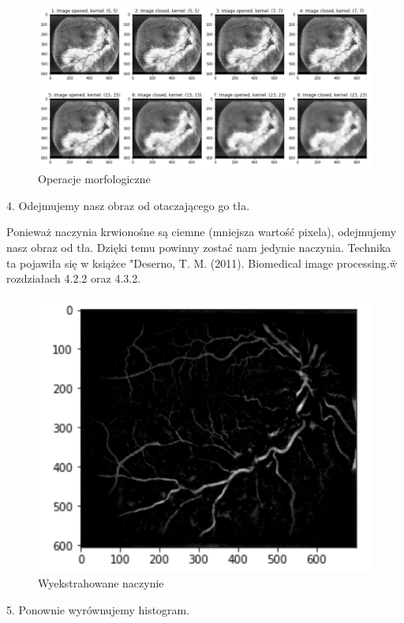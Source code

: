 \documentclass[11pt]{article}
\begin{document}
\begin{figure}[h]
    \centering
	\includegraphics[scale=0.3]{res/img_pro_3.png}
	\caption{Operacje morfologiczne}
	\label{fig:demo}
\end{figure}
\newpage

4. Odejmujemy nasz obraz od otaczającego go tła.

Ponieważ naczynia krwionośne są ciemne (mniejsza wartość pixela), odejmujemy nasz obraz od tła. Dzięki temu powinny zostać nam jedynie naczynia. Technika ta pojawiła się w książce "Deserno, T. M. (2011). Biomedical image processing.\" w rozdziałach 4.2.2 oraz 4.3.2.

\begin{figure}[h]
    \centering
	\includegraphics[scale=0.5]{res/img_pro_4.png}
	\caption{Wyekstrahowane naczynie}
	\label{fig:demo}
\end{figure}

5. Ponownie wyrównujemy histogram.
\end{document}

